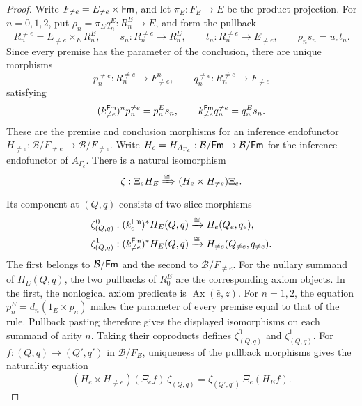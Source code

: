 \begin{proof}
Write $F_{\ne e}=E_{\ne e}\times\mathsf{Fm}$, and let
$\pi_E:F_E\to E$ be the product projection. For $n=0,1,2$,
put $\rho_n=\pi_Eq_n^E:R_n^E\to E$, and form the pullback
\[
 R_n^{\ne e}=E_{\ne e}\times_E R_n^E,
 \qquad s_n:R_n^{\ne e}\to R_n^E,
 \qquad t_n:R_n^{\ne e}\to E_{\ne e},
 \qquad \rho_ns_n=u_et_n.
\]
Since every premise has the parameter of the conclusion, there
are unique morphisms
\[
 p_n^{\ne e}:R_n^{\ne e}\to F_{\ne e}^n,
 \qquad q_n^{\ne e}:R_n^{\ne e}\to F_{\ne e}
\]
satisfying
\[
 (k_{\ne e}^{\mathsf{Fm}})^n p_n^{\ne e}=p_n^Es_n,
 \qquad k_{\ne e}^{\mathsf{Fm}}q_n^{\ne e}=q_n^Es_n.
\]
These are the premise and conclusion morphisms for an inference
endofunctor
$H_{\ne e}:\mathcal B/F_{\ne e}\to\mathcal B/F_{\ne e}$.
Write $H_e=H_{A_{\Gamma_e}}:\mathcal B/\mathsf{Fm}\to\mathcal B/\mathsf{Fm}$
for the inference endofunctor of $A_{\Gamma_e}$.
There is a natural isomorphism
\[
 \zeta:\Xi_eH_E\xRightarrow{\cong}
                 (H_e\times H_{\ne e})\Xi_e.
\]
Its component at $(Q,q)$ consists of two slice morphisms
\[
 \begin{aligned}
 \zeta^0_{(Q,q)}&:(k_e^{\mathsf{Fm}})^*H_E(Q,q)\xrightarrow{\cong}
                                      H_e(Q_e,q_e),\\
 \zeta^1_{(Q,q)}&:(k_{\ne e}^{\mathsf{Fm}})^*H_E(Q,q)\xrightarrow{\cong}
                                      H_{\ne e}(Q_{\ne e},q_{\ne e}).
 \end{aligned}
\]
The first belongs to $\mathcal B/\mathsf{Fm}$ and the second to
$\mathcal B/F_{\ne e}$.
For the nullary summand of $H_E(Q,q)$, the two pullbacks of
$R_0^E$ are the corresponding axiom objects. In the first,
the nonlogical axiom predicate is $\operatorname{Ax}(\bar e,z)$.
For $n=1,2$, the equation $p_n^E=d_n(1_E\times p_n)$ makes
the parameter of every premise equal to that of the rule.
Pullback pasting therefore gives the displayed isomorphisms on
each summand of arity $n$. Taking their coproducts defines
$\zeta^0_{(Q,q)}$ and $\zeta^1_{(Q,q)}$.
For $f:(Q,q)\to(Q',q')$ in $\mathcal B/F_E$, uniqueness
of the pullback morphisms gives the naturality equation
\[
 (H_e\times H_{\ne e})(\Xi_e f)\,\zeta_{(Q,q)}
   =\zeta_{(Q',q')}\,\Xi_e(H_Ef).
\]


\end{proof}
